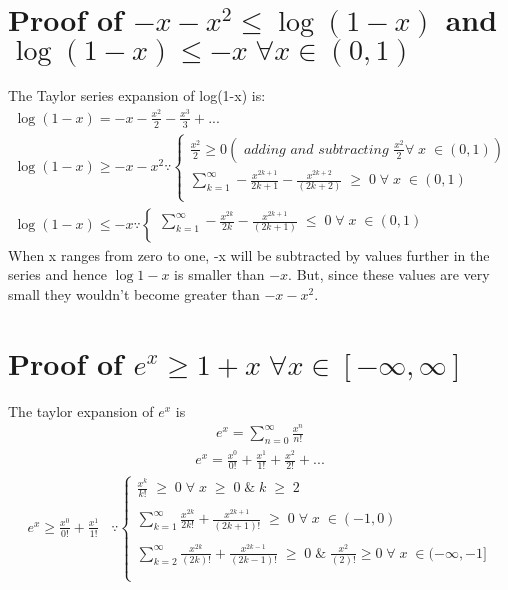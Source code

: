 \documentclass[11pt]{article}
\begin{document}
\section{Proof of $-x-x^2\leq\log(1-x)\label{appendix:ineq2}$ and
    $\log(1-x)\leq-x \;\forall x \in (0,1)\label{appendix:ineq1}$}
The Taylor series expansion of log(1-x) is:
\begin{align}
\log(1-x)=-x-\frac{x^2}{2}-\frac{x^3}{3}+... \nonumber && \\
	\log(1-x) \ge -x -x^{2} 
	\because	
	\begin{cases}
	\frac{x^{2}}{2} \ge 0 (\textit{ adding and subtracting }  \frac{x^{2}}{2} \forall \; x \; \in (0, 1) ) \\
	\sum_{k = 1}^{\infty} -\frac{x^{2k+1}}{2k+1} - \frac{x^{2k+2}}{(2k+2)}\; \ge \; 0 \; \forall \; x \; \in (0, 1) \\
	\end{cases} \\
	\log(1-x) \le -x 
	\because	
	\begin{cases}
	\sum_{k = 1}^{\infty} -\frac{x^{2k}}{2k} - \frac{x^{2k+1}}{(2k+1)}\; \le \; 0 \; \forall \; x \; \in (0, 1) \\
	\end{cases}  
\end{align}
When x ranges from zero to one, -x will be subtracted by values further in the series and hence $\log{1-x}$ is smaller than $-x.$ But, since these values are very small they wouldn't become greater than $-x-x^{2}$.  

\section{Proof of $e^x \ge 1 + x \;\forall x \in [-\infty, \infty]$ } \label{appendix: ex}

The taylor expansion of $e^x$ is
\begin{align*}
	e^x = \sum_{n = 0}^{\infty} \frac{x^n}{n!}
\end{align*}
\begin{align*}
	e^x = \frac{x^0}{0!} + \frac{x^1}{1!} + \frac{x^2}{2!} + ... 
\end{align*} 
\begin{align*}
	e^x \ge \frac{x^0}{0!} + \frac{x^1}{1!}  \;\;\;\because
	\begin{cases}
			\frac{x^k}{k!} \;\ge\; 0 \;\forall\;x \; \ge \;0 \;\& \; k\; \ge\; 2\; \\ \\
		\sum_{k = 1}^{\infty}\frac{x^{2k}}{2k!} + \frac{x^{2k+1}}{(2k+1)!}\; \ge \; 0 \; \forall \; x \; \in (-1, 0) \\ \\ 
		\sum_{k = 2}^{\infty}\frac{x^{2k}}{(2k)!} + \frac{x^{2k-1}}{(2k-1)!}\; \ge \; 0 \;\&\; \frac{x^{2}}{(2)!} \ge 0\; \forall \; x \; \in (-\infty, -1] \\ \\
	  \end{cases}    
\end{align*}
		
\end{document}
